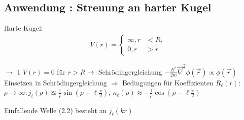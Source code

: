 \subsection{Anwendung : Streuung an harter Kugel} 
	Harte Kugel:
	\begin{align*}
	V (r) =
	\left\{
	\begin{aligned}
	\infty , r &< R, \\
	0 , r &> r
	\end{aligned}
	\right.
	\end{align*}
	
	$\rightarrow$ %
1
	$V(r)= 0$ für $r>R \rightarrow$ Schrödingergleichung $-\frac{\hbar^2}{2m} \vec{\nabla}^2 \phi(\vec{r})
	\propto \phi(\vec{r})$
	Einsetzen in Schrödingergleichung $\Rightarrow$ Bedingungen für Koeffizienten $R_\ell(r)$:
	$\rho \rightarrow \infty : j_\ell (\rho) \approxeq \frac{1}{\rho} \sin(\rho-\ell\frac{\pi}{2})$,
	$n_\ell (\rho) \approx -\frac{1}{\rho}  \cos(\rho-\ell\frac{\pi}{2})$
	
	Einfallende Welle (2.2) besteht an $j_\ell (kr)$
	
